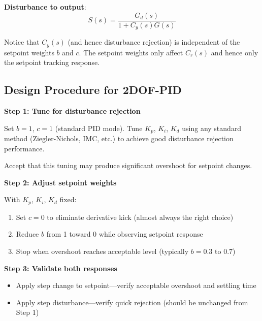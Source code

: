 \textbf{Disturbance to output}:
\begin{equation}
S(s) = \frac{G_d(s)}{1 + C_y(s) G(s)}
\end{equation}

Notice that $C_y(s)$ (and hence disturbance rejection) is independent of the setpoint weights $b$ and $c$. The setpoint weights only affect $C_r(s)$ and hence only the setpoint tracking response.

\subsection{Design Procedure for 2DOF-PID}
\label{subsec:2dof_design}

\textbf{Step 1: Tune for disturbance rejection}

Set $b = 1$, $c = 1$ (standard PID mode). Tune $K_p$, $K_i$, $K_d$ using any standard method (Ziegler-Nichols, IMC, etc.) to achieve good disturbance rejection performance.

Accept that this tuning may produce significant overshoot for setpoint changes.

\textbf{Step 2: Adjust setpoint weights}

With $K_p$, $K_i$, $K_d$ fixed:
\begin{enumerate}
    \item Set $c = 0$ to eliminate derivative kick (almost always the right choice)
    \item Reduce $b$ from 1 toward 0 while observing setpoint response
    \item Stop when overshoot reaches acceptable level (typically $b = 0.3$ to $0.7$)
\end{enumerate}

\textbf{Step 3: Validate both responses}
\begin{itemize}
    \item Apply step change to setpoint---verify acceptable overshoot and settling time
    \item Apply step disturbance---verify quick rejection (should be unchanged from Step 1)
\end{itemize}

